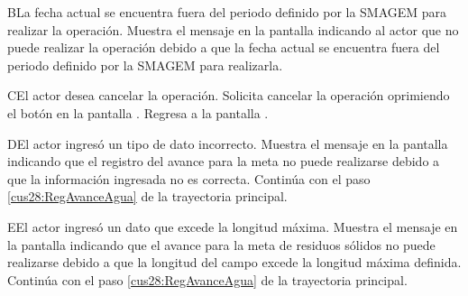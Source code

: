     \begin{UCtrayectoriaA}{B}{La fecha actual se encuentra fuera del periodo definido por la SMAGEM para realizar la operación.}
      \UCpaso[\UCsist] Muestra el mensaje  en la pantalla  indicando al actor que no puede realizar la operación debido a que la fecha actual se encuentra fuera del periodo definido por la SMAGEM para realizarla. 
    \end{UCtrayectoriaA}
     
     \begin{UCtrayectoriaA}{C}{El actor desea cancelar la operación.}
      \UCpaso[\UCactor] Solicita cancelar la operación oprimiendo el botón  en la pantalla .
      \UCpaso[\UCsist] Regresa a la pantalla . 
    \end{UCtrayectoriaA}
    
    \begin{UCtrayectoriaA}{D}{El actor ingresó un tipo de dato incorrecto.}    
	\UCpaso[\UCsist] Muestra el mensaje  en la pantalla  indicando que el registro del avance para la meta no puede realizarse debido a que la información ingresada no es correcta.
	\UCpaso[] Continúa con el paso \ref{cus28:RegAvanceAgua} de la trayectoria principal.     
    \end{UCtrayectoriaA}
    
    \begin{UCtrayectoriaA}{E}{El actor ingresó un dato que excede la longitud máxima.}    
	\UCpaso[\UCsist] Muestra el mensaje  en la pantalla  indicando que el avance para la meta de residuos sólidos no puede realizarse debido a que la longitud del campo excede la longitud máxima definida.
	\UCpaso[] Continúa con el paso \ref{cus28:RegAvanceAgua} de la trayectoria principal.     
    \end{UCtrayectoriaA}
